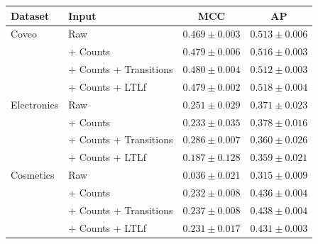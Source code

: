 \begin{tabular}{llcc}
\toprule Dataset & Input & MCC & AP \\
\midrule
Coveo & Raw & $0.469\pm0.003$ & $0.513\pm0.006$ \\
 & + Counts & $0.479\pm0.006$ & $0.516\pm0.003$ \\
 & + Counts + Transitions & $0.480\pm0.004$ & $0.512\pm0.003$ \\
 & + Counts + LTLf & $0.479\pm0.002$ & $0.518\pm0.004$ \\
\midrule
Electronics & Raw & $0.251\pm0.029$ & $0.371\pm0.023$ \\
 & + Counts & $0.233\pm0.035$ & $0.378\pm0.016$ \\
 & + Counts + Transitions & $0.286\pm0.007$ & $0.360\pm0.026$ \\
 & + Counts + LTLf & $0.187\pm0.128$ & $0.359\pm0.021$ \\
\midrule
Cosmetics & Raw & $0.036\pm0.021$ & $0.315\pm0.009$ \\
 & + Counts & $0.232\pm0.008$ & $0.436\pm0.004$ \\
 & + Counts + Transitions & $0.237\pm0.008$ & $0.438\pm0.004$ \\
 & + Counts + LTLf & $0.231\pm0.017$ & $0.431\pm0.003$ \\
\bottomrule
\end{tabular}